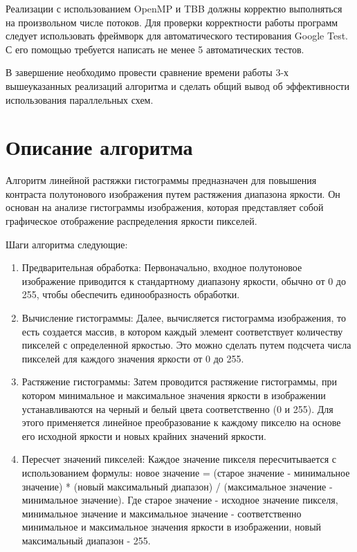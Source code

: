 \documentclass[14pt, russian]{extarticle}
\begin{document}
	Реализации с использованием OpenMP и TBB должны корректно выполняться на произвольном числе потоков. Для проверки корректности работы программ следует использовать фреймворк для автоматического тестирования Google Test. С его помощью требуется написать не менее 5 автоматических тестов.
	
	В завершение необходимо провести сравнение времени работы 3-х вышеуказанных реализаций алгоритма и сделать общий вывод об эффективности использования параллельных схем.
	
	\newpage

	\section{Описание алгоритма}
		Алгоритм линейной растяжки гистограммы предназначен для повышения контраста полутонового изображения путем растяжения диапазона яркости. Он основан на анализе гистограммы изображения, которая представляет собой графическое отображение распределения яркости пикселей.
	
	Шаги алгоритма следующие:
	\begin{enumerate}[topsep=0pt, labelwidth=!, labelindent=0pt]
		\item Предварительная обработка: Первоначально, входное полутоновое изображение приводится к стандартному диапазону яркости, обычно от 0 до 255, чтобы обеспечить единообразность обработки.
		
		\item Вычисление гистограммы: Далее, вычисляется гистограмма изображения, то есть создается массив, в котором каждый элемент соответствует количеству пикселей с определенной яркостью. Это можно сделать путем подсчета числа пикселей для каждого значения яркости от 0 до 255.
		
		\item Растяжение гистограммы: Затем проводится растяжение гистограммы, при котором минимальное и максимальное значения яркости в изображении устанавливаются на черный и белый цвета соответственно (0 и 255). Для этого применяется линейное преобразование к каждому пикселю на основе его исходной яркости и новых крайних значений яркости.
		
		\item Пересчет значений пикселей: Каждое значение пикселя пересчитывается с использованием формулы:
		новое значение = (старое значение - минимальное значение) * (новый максимальный диапазон) / (максимальное значение - минимальное значение).
		Где старое значение - исходное значение пикселя, минимальное значение и максимальное значение - соответственно минимальное и максимальное значения яркости в изображении, новый максимальный диапазон - 255.
	\end{enumerate}
	
\end{document}
